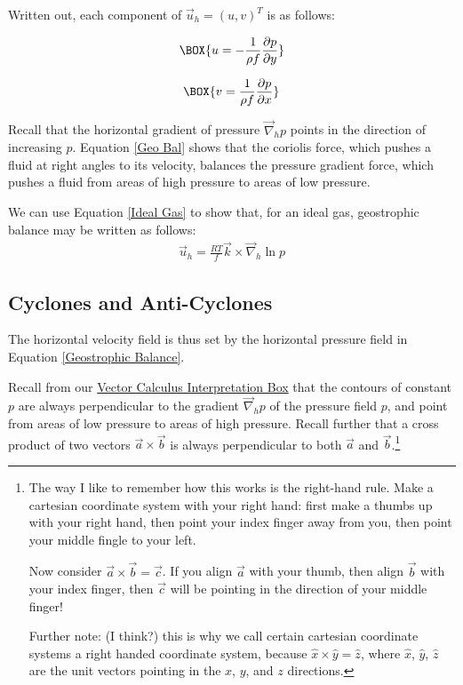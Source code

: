 Written out, each component of $\vec{u}_h=(u,v)^T$ is as follows:

\begin{minipage}{0.45\linewidth}
    \begin{align*}
        \BOX{u = -\frac{1}{\rho f}\frac{\partial p}{\partial y}}
    \end{align*}
\end{minipage}
\hfill
\begin{minipage}{0.45\linewidth}
    \begin{align*}
        \BOX{v = \frac{1}{\rho f}\frac{\partial p}{\partial x}}
    \end{align*}
\end{minipage}

Recall that the horizontal gradient of pressure $\vec{\nabla}_h p$ points in the direction of increasing $p$. Equation \ref{Geo Bal} shows that the coriolis force, which pushes a fluid at right angles to its velocity, balances the pressure gradient force, which pushes a fluid from areas of high pressure to areas of low pressure.

We can use Equation \ref{Ideal Gas} to show that, for an ideal gas, geostrophic balance may be written as follows:
\begin{align}
    \label{Geostrophic Ideal Gas}
    \vec{u}_h=\frac{RT}{ f}\vec{k}\times\vec{\nabla}_h\ln p
\end{align}

\subsection{Cyclones and Anti-Cyclones}\label{Cyclones}

The horizontal velocity field is thus set by the horizontal pressure field in Equation \ref{Geostrophic Balance}. 

Recall from our \hyperref[VC Interp]{Vector Calculus Interpretation Box} that the contours of constant $p$ are always perpendicular to the gradient $\vec{\nabla}_h p$ of the pressure field $p$, and point from areas of low pressure to areas of high pressure. Recall further that a cross product of two vectors $\vec{a}\times\vec{b}$ is always perpendicular to both $\vec{a}$ and $\vec{b}$.\footnote{
    The way I like to remember how this works is the right-hand rule. Make a cartesian coordinate system with your right hand: first make a thumbs up with your right hand, then point your index finger away from you, then point your middle fingle to your left.

    Now consider $\vec{a}\times\vec{b}=\vec{c}$. If you align $\vec{a}$ with your thumb, then align $\vec{b}$ with your index finger, then $\vec{c}$ will be pointing in the direction of your middle finger!

    Further note: (I think?) this is why we call certain cartesian coordinate systems a right handed coordinate system, because $\hat{x}\times\hat{y}=\hat{z}$, where $\hat{x}$, $\hat{y}$, $\hat{z}$ are the unit vectors pointing in the $x$, $y$, and $z$ directions.
}

